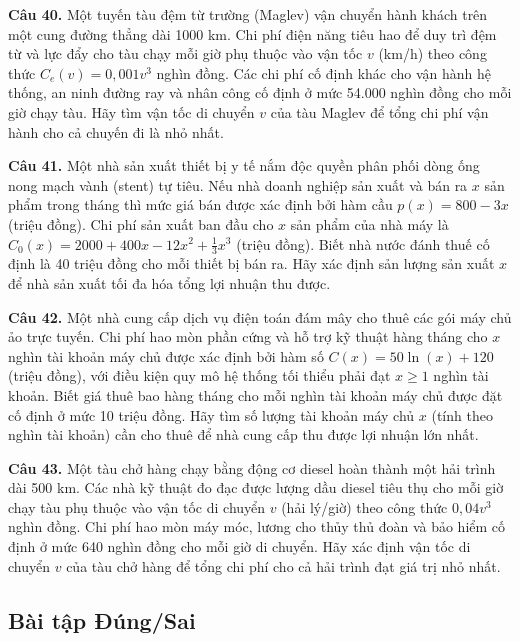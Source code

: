 \documentclass[12pt]{article}
\begin{document}
	\vspace{0.6cm}
	\noindent \textbf{Câu 40.} Một tuyến tàu đệm từ trường (Maglev) vận chuyển hành khách trên một cung đường thẳng dài 1000 km. Chi phí điện năng tiêu hao để duy trì đệm từ và lực đẩy cho tàu chạy mỗi giờ phụ thuộc vào vận tốc $v$ (km/h) theo công thức $C_e(v) = 0,001v^3$ nghìn đồng. Các chi phí cố định khác cho vận hành hệ thống, an ninh đường ray và nhân công cố định ở mức 54.000 nghìn đồng cho mỗi giờ chạy tàu. Hãy tìm vận tốc di chuyển $v$ của tàu Maglev để tổng chi phí vận hành cho cả chuyến đi là nhỏ nhất.
	
	\vspace{0.6cm}
	\noindent \textbf{Câu 41.} Một nhà sản xuất thiết bị y tế nắm độc quyền phân phối dòng ống nong mạch vành (stent) tự tiêu. Nếu nhà doanh nghiệp sản xuất và bán ra $x$ sản phẩm trong tháng thì mức giá bán được xác định bởi hàm cầu $p(x) = 800 - 3x$ (triệu đồng). Chi phí sản xuất ban đầu cho $x$ sản phẩm của nhà máy là $C_0(x) = 2000 + 400x - 12x^2 + \frac{1}{3}x^3$ (triệu đồng). Biết nhà nước đánh thuế cố định là 40 triệu đồng cho mỗi thiết bị bán ra. Hãy xác định sản lượng sản xuất $x$ để nhà sản xuất tối đa hóa tổng lợi nhuận thu được.
	
	\vspace{0.6cm}
	\noindent \textbf{Câu 42.} Một nhà cung cấp dịch vụ điện toán đám mây cho thuê các gói máy chủ ảo trực tuyến. Chi phí hao mòn phần cứng và hỗ trợ kỹ thuật hàng tháng cho $x$ nghìn tài khoản máy chủ được xác định bởi hàm số $C(x) = 50\ln(x) + 120$ (triệu đồng), với điều kiện quy mô hệ thống tối thiểu phải đạt $x \ge 1$ nghìn tài khoản. Biết giá thuê bao hàng tháng cho mỗi nghìn tài khoản máy chủ được đặt cố định ở mức 10 triệu đồng. Hãy tìm số lượng tài khoản máy chủ $x$ (tính theo nghìn tài khoản) cần cho thuê để nhà cung cấp thu được lợi nhuận lớn nhất.
	
	\vspace{0.6cm}
	\noindent \textbf{Câu 43.} Một tàu chở hàng chạy bằng động cơ diesel hoàn thành một hải trình dài 500 km. Các nhà kỹ thuật đo đạc được lượng dầu diesel tiêu thụ cho mỗi giờ chạy tàu phụ thuộc vào vận tốc di chuyển $v$ (hải lý/giờ) theo công thức $0,04v^3$ nghìn đồng. Chi phí hao mòn máy móc, lương cho thủy thủ đoàn và bảo hiểm cố định ở mức 640 nghìn đồng cho mỗi giờ di chuyển. Hãy xác định vận tốc di chuyển $v$ của tàu chở hàng để tổng chi phí cho cả hải trình đạt giá trị nhỏ nhất.
	
	
	\subsection{Bài tập Đúng/Sai}
	
\end{document}
